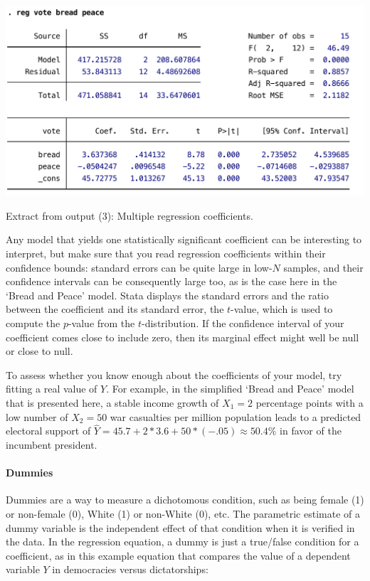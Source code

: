 	\begin{table}[htp]
		\includegraphics[scale=.5]{images/hibbs_yx1x2.pdf}

	  	\caption[Extract from  output (3): Multiple regression coefficients]{\label{tbl:hibbs_yx1x2}
		Extract from  output (3): Multiple regression coefficients.\\
		\hibbs}
	\end{table}%
	
	Any model that yields one statistically significant coefficient can be interesting to interpret, but make sure that you read regression coefficients within their confidence bounds: standard errors can be quite large in low-$N$ samples, and their confidence intervals can be consequently large too, as is the case here in the `Bread and Peace' model. Stata displays the standard errors and the ratio between the coefficient and its standard error, the $t$-value, which is used to compute the $p$-value from the $t$-distribution. If the confidence interval of your coefficient comes close to include zero, then its marginal effect might well be null or close to null.
	
	To assess whether you know enough about the coefficients of your model, try fitting a real value of $Y$. For example, in the simplified `Bread and Peace' model that is presented here, a stable income growth of $X_1=2$ percentage points with a low number of $X_2=50$ war casualties per million population leads to a predicted electoral support of $\hat Y = 45.7 + 2*3.6 + 50*(-.05) \approx 50.4\%$ in favor of the incumbent president.

	\paragraph{Dummies}%
	\label{sec:dummies}%
	Dummies are a way to measure a dichotomous condition, such as being female (1) or non-female (0), White (1) or non-White (0), etc. The parametric estimate of a dummy variable is the independent effect of that condition when it is verified in the data. In the regression equation, a dummy is just a true/false condition for a coefficient, as in this example equation that compares the value of a dependent variable $Y$ in democracies versus dictatorships:

